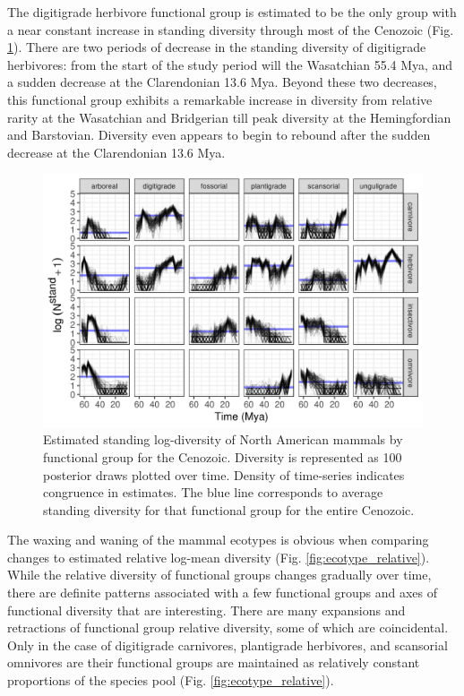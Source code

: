 \documentclass[12pt,letterpaper]{article}
\begin{document}
The digitigrade herbivore functional group is estimated to be the only group with a near constant increase in standing diversity through most of the Cenozoic (Fig. \ref{fig:ecotype_diversity}). There are two periods of decrease in the standing diversity of digitigrade herbivores: from the start of the study period will the Wasatchian 55.4 Mya, and a sudden decrease at the Clarendonian 13.6 Mya. Beyond these two decreases, this functional group exhibits a remarkable increase in diversity from relative rarity at the Wasatchian and Bridgerian till peak diversity at the Hemingfordian and Barstovian. Diversity even appears to begin to rebound after the sudden decrease at the Clarendonian 13.6 Mya.
\begin{figure}[ht]
  \centering
  \includegraphics[width=\textwidth,height=0.5\textheight,keepaspectratio=true]{figure/ecotype_diversity}
  \caption{Estimated standing log-diversity of North American mammals by functional group for the Cenozoic. Diversity is represented as 100 posterior draws plotted over time. Density of time-series indicates congruence in estimates. The blue line corresponds to average standing diversity for that functional group for the entire Cenozoic.} 
  \label{fig:ecotype_diversity}
\end{figure}



The waxing and waning of the mammal ecotypes is obvious when comparing changes to estimated relative log-mean diversity (Fig. \ref{fig:ecotype_relative}). While the relative diversity of functional groups changes gradually over time, there are definite patterns associated with a few functional groups and axes of functional diversity that are interesting. There are many expansions and retractions of functional group relative diversity, some of which are coincidental. Only in the case of digitigrade carnivores, plantigrade herbivores, and scansorial omnivores are their functional groups are maintained as relatively constant proportions of the species pool (Fig. \ref{fig:ecotype_relative}).
\end{document}
